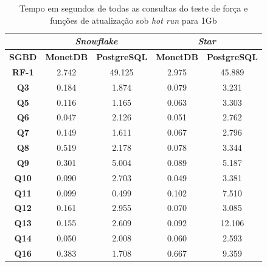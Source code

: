 \begin{table}[htpb]
        \centering
        \caption{Tempo em segundos de todas as consultas do teste de força e funções de atualização sob \textit{hot run} para 1Gb}
        \label{tab:queries_hot_1}
        \begin{tabular}{|c|c|c|c|c|}
        \hline
        & \multicolumn{2}{c|}{\textit{\textbf{Snowflake}}} & \multicolumn{2}{c|}{\textit{\textbf{Star}}} \\ \hline
        \textbf{SGBD}  & \textbf{MonetDB}      & \textbf{PostgreSQL}      & \textbf{MonetDB}    & \textbf{PostgreSQL}   \\ \hline
        \textbf{RF-1}  & 2.742             & 49.125              & 2.975            & 45.889              \\ \hline
        \textbf{Q3}    & 0.184             & 1.874               & 0.079            & 3.231               \\ \hline
        \textbf{Q5}    & 0.116             & 1.165               & 0.063            & 3.303               \\ \hline
        \textbf{Q6}    & 0.047             & 2.126               & 0.051            & 2.762               \\ \hline
        \textbf{Q7}    & 0.149             & 1.611               & 0.067            & 2.796               \\ \hline
        \textbf{Q8}    & 0.519             & 2.178               & 0.078            & 3.344               \\ \hline
        \textbf{Q9}    & 0.301             & 5.004               & 0.089            & 5.187               \\ \hline
        \textbf{Q10}   & 0.090             & 2.703               & 0.049            & 3.381               \\ \hline
        \textbf{Q11}   & 0.099             & 0.499               & 0.102            & 7.510               \\ \hline
        \textbf{Q12}   & 0.161             & 2.955               & 0.070            & 3.085               \\ \hline
        \textbf{Q13}   & 0.155             & 2.609               & 0.092            & 12.106              \\ \hline
        \textbf{Q14}   & 0.050             & 2.008               & 0.060            & 2.593               \\ \hline
        \textbf{Q16}   & 0.383             & 1.708               & 0.667            & 9.359               \\ \hline

\end{tabular}
\end{table}
